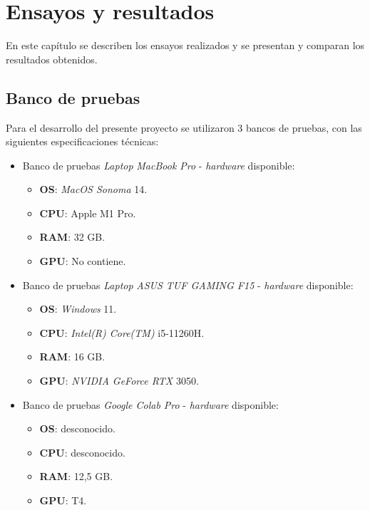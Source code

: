 
\chapter{Ensayos y resultados} %

\label{Chapter4} %

En este capítulo se describen los ensayos realizados y se presentan y comparan los resultados obtenidos.

\section{Banco de pruebas}
\label{sec:pruebasHW}

Para el desarrollo del presente proyecto se utilizaron 3 bancos de pruebas, con las siguientes especificaciones técnicas:

\begin{itemize}
\item Banco de pruebas \textit{Laptop} \textit{MacBook Pro} - \textit{hardware} disponible:
	\begin{itemize}
	\item \textbf{OS}: \textit{MacOS Sonoma} 14.
	\item \textbf{CPU}: Apple M1 Pro.
	\item \textbf{RAM}: 32 GB.
	\item \textbf{GPU}: No contiene.
	\end{itemize}
\item Banco de pruebas \textit{Laptop} \textit{ASUS TUF GAMING F15} - \textit{hardware} disponible:
	\begin{itemize}
	\item \textbf{OS}: \textit{Windows} 11.
	\item \textbf{CPU}: \textit{Intel(R) Core(TM)} i5-11260H.
	\item \textbf{RAM}: 16 GB.
	\item \textbf{GPU}: \textit{NVIDIA GeForce RTX} 3050.
	\end{itemize}
\item Banco de pruebas \textit{Google Colab Pro} - \textit{hardware} disponible:
	\begin{itemize}
	\item \textbf{OS}: desconocido.
	\item \textbf{CPU}: desconocido.
	\item \textbf{RAM}: 12,5 GB.
	\item \textbf{GPU}: T4.
	\end{itemize}
\end{itemize}

